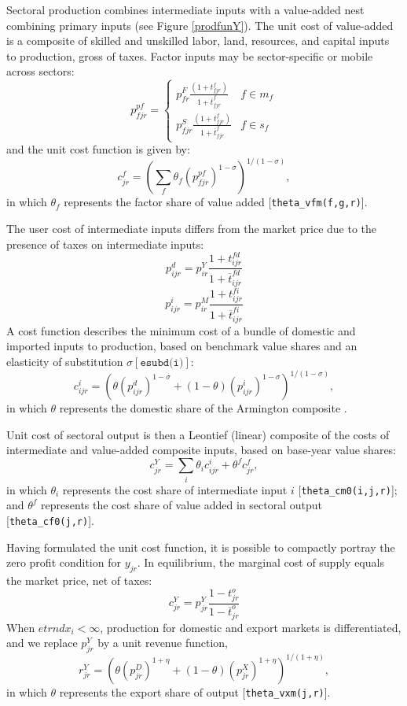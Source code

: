 Sectoral production combines intermediate inputs with a value-added nest combining primary inputs (see Figure \ref{prodfunY}).
The unit cost of value-added is a \CES composite of skilled and unskilled labor, land, resources, and capital inputs to production, gross of taxes.
Factor inputs may be sector-specific or mobile across sectors:
$$p^{pf}_{fjr} = \left\{\begin{array}{lr}
p^F_{fr} \frac{(1+t^f_{fjr})}{1+\overline{t}^f_{fjr}} & f \in m_f\\
p^S_{fjr} \frac{(1+t^f_{fjr})}{1+\overline{t}^f_{fjr}} & f \in s_f
\end{array} \right.$$
and the unit cost function is given by:
$$c^f_{jr} = \left( \sum_f \theta_f \left( p^{pf}_{fjr}
\right)^{1-\sigma} \right)^{1/(1-\sigma)},$$ in which $\theta_f$ represents the factor share of value added [{\small \texttt{theta\_vfm(f,g,r)}}].

The user cost of intermediate inputs differs from the market price due to the presence of taxes on intermediate inputs:
$$p^d_{ijr} = p^Y_{ir} \frac{1+t^{fd}_{ijr}}{1+\overline{t}^{fd}_{ijr}}$$
$$p^i_{ijr} = p^M_{ir}
\frac{1+t^{fi}_{ijr}}{1+\overline{t}^{fi}_{ijr}}$$ A \CES cost function describes the minimum cost of a bundle of domestic and imported inputs to production, based on benchmark value shares and an elasticity of substitution $\sigma [\texttt{esubd(i)}]$:
$$c^i_{ijr} = \left( \theta (p^d_{ijr})^{1-\sigma} +
             (1-\theta) (p^i_{ijr})^{1-\sigma} \right)^{1/(1-\sigma)},$$ in which $\theta$ represents the domestic share of the Armington composite \hfill {}.

Unit cost of sectoral output is then a Leontief (linear) composite of the costs of intermediate and value-added composite inputs, based on base-year value shares:
$$c^Y_{jr} = \sum_i \theta_i c^i_{ijr} + \theta^f c^f_{jr},$$
in which $\theta_i$ represents the cost share of intermediate input $i$ [{\small \texttt{theta\_cm0(i,j,r)}}]; and $\theta^f$ represents the cost share of value added in sectoral output [{\small \texttt{theta\_cf0(j,r)}}].

Having formulated the unit cost function, it is possible to compactly portray the zero profit condition for $y_{jr}$.
In equilibrium, the marginal cost of supply equals the market price, net of taxes:
\begin{equation}
c^Y_{jr} = p^Y_{jr} \frac{1-t^o_{jr}}{1-\overline{t}^o_{jr}}
\end{equation}
When $\textit{etrndx}_{i}<\infty$, production for domestic and export markets is differentiated, and we replace $p^Y_{jr}$ by a unit revenue function,
$$r^Y_{jr} = \left( \theta (p^D_{jr})^{1+\eta} +
(1-\theta) (p^X_{jr})^{1+\eta} \right)^{1/(1+\eta)},$$ in which $\theta$ represents the export share of output [{\small \texttt{theta\_vxm(j,r)}}].

